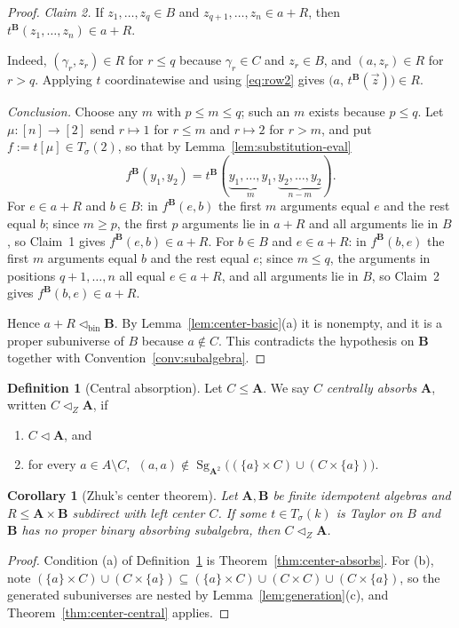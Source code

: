 \documentclass[11pt]{article}
\theoremstyle{mainplain}
\newtheorem{corollary}[theorem]{Corollary}
\theoremstyle{mainroman}
\theoremstyle{definition}
\newtheorem{definition}[theorem]{Definition}
\newcommand{\alphlabels}{\renewcommand{\labelenumi}{\textup{(\alph{enumi})}}%
  \renewcommand{\theenumi}{\alph{enumi}}}
\providecommand{\tightlist}{\setlength{\itemsep}{0pt}\setlength{\parskip}{0pt}}
\numberwithin{equation}{section}
\DeclareMathOperator{\Sg}{Sg}
\newcommand{\bA}{\mathbf A}
\newcommand{\bB}{\mathbf B}
\newcommand{\ab}{\lhd}
\newcommand{\abin}{\lhd_{\mathrm{bin}}}
\newcommand{\aZ}{\lhd_{Z}}
\newcommand{\Tm}{T_\sigma}
\begin{document}
\begin{proof}
\emph{Claim 2.} If $z_1,\dots,z_q\in B$ and $z_{q+1},\dots,z_n\in a+R$, then
$t^{\bB}(z_1,\dots,z_n)\in a+R$.

Indeed, $(\gamma_r,z_r)\in R$ for $r\le q$ because $\gamma_r\in C$ and
$z_r\in B$, and $(a,z_r)\in R$ for $r>q$. Applying $t$ coordinatewise and
using \eqref{eq:row2} gives $\bigl(a,\,t^{\bB}(\vec z)\bigr)\in R$.

\emph{Conclusion.} Choose any $m$ with $p\le m\le q$; such an $m$ exists because
$p\le q$. Let $\mu:[n]\to[2]$ send $r\mapsto1$ for $r\le m$ and $r\mapsto2$ for
$r>m$, and put $f:=t[\mu]\in\Tm(2)$, so that by
Lemma~\ref{lem:substitution-eval}
\[
 f^{\bB}(y_1,y_2)=t^{\bB}(\underbrace{y_1,\dots,y_1}_{m},\underbrace{y_2,\dots,y_2}_{n-m}).
\]
For $e\in a+R$ and $b\in B$: in $f^{\bB}(e,b)$ the first $m$ arguments equal
$e$ and the rest equal $b$; since $m\ge p$, the first $p$ arguments lie in
$a+R$ and all arguments lie in $B$, so Claim~1 gives $f^{\bB}(e,b)\in a+R$.
For $b\in B$ and $e\in a+R$: in $f^{\bB}(b,e)$ the first $m$ arguments equal
$b$ and the rest equal $e$; since $m\le q$, the arguments in positions
$q+1,\dots,n$ all equal $e\in a+R$, and all arguments lie in $B$, so Claim~2
gives $f^{\bB}(b,e)\in a+R$.

Hence $a+R\abin\bB$. By Lemma~\ref{lem:center-basic}(a) it is nonempty, and it
is a proper subuniverse of $B$ because $a\notin C$. This contradicts the
hypothesis on $\bB$ together with Convention~\ref{conv:subalgebra}.
\end{proof}

\begin{definition}[Central absorption]\label{def:central-absorption}
Let $C\le\bA$. We say $C$ \emph{centrally absorbs} $\bA$, written $C\aZ\bA$,
if
\begin{enumerate}\alphlabels\tightlist
\item $C\ab\bA$, and
\item for every $a\in A\setminus C$,
      $\;(a,a)\notin\Sg_{\bA^2}\bigl((\{a\}\times C)\cup(C\times\{a\})\bigr)$.
\end{enumerate}
\end{definition}

\begin{corollary}[Zhuk's center theorem]\label{cor:zhuk-center}
Let $\bA,\bB$ be finite idempotent algebras and $R\le\bA\times\bB$ subdirect
with left center $C$. If some $t\in\Tm(k)$ is Taylor on $B$ and $\bB$ has no
proper binary absorbing subalgebra, then $C\aZ\bA$.
\end{corollary}
\begin{proof}
Condition (a) of Definition~\ref{def:central-absorption} is
Theorem~\ref{thm:center-absorbs}. For (b), note
$(\{a\}\times C)\cup(C\times\{a\})\subseteq
 (\{a\}\times C)\cup(C\times C)\cup(C\times\{a\})$, so the generated
subuniverses are nested by Lemma~\ref{lem:generation}(c), and
Theorem~\ref{thm:center-central} applies.
\end{proof}
\end{document}
